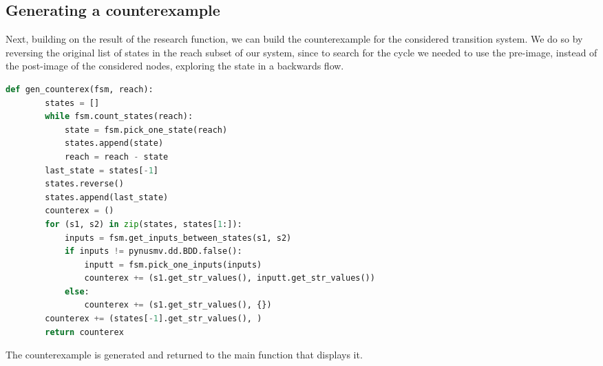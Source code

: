 \documentclass[9pt,oneside]{amsart}
\begin{document}
\begin{multicols}{2}
  \section{Generating a counterexample}\label{back}

  Next, building on the result of the research function, we can build
  the counterexample for the considered transition system. We do so by
  reversing the original list of states in the reach subset of our
  system, since to search for the cycle we needed to use the pre-image,
  instead of the post-image of the considered nodes, exploring the
  state in a backwards flow.
  \begin{lstlisting}[language=Python]
      def gen_counterex(fsm, reach):
      	states = []
      	while fsm.count_states(reach):
      		state = fsm.pick_one_state(reach)
      		states.append(state)
      		reach = reach - state
      	last_state = states[-1]
      	states.reverse()
      	states.append(last_state)
      	counterex = ()
      	for (s1, s2) in zip(states, states[1:]):
      		inputs = fsm.get_inputs_between_states(s1, s2)
      		if inputs != pynusmv.dd.BDD.false():
      			inputt = fsm.pick_one_inputs(inputs)
      			counterex += (s1.get_str_values(), inputt.get_str_values())
      		else:
      			counterex += (s1.get_str_values(), {})
      	counterex += (states[-1].get_str_values(), )
      	return counterex
  \end{lstlisting}
  The counterexample is generated and returned to the main function
  that displays it.
\end{multicols}
\end{document}
